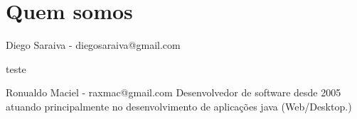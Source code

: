 \section{Quem somos}

\begin{frame}
	\begin{block}{Diego Saraiva - diegosaraiva@gmail.com}
		
		teste
	\end{block}
	
	\begin{block}{Ronualdo Maciel - raxmac@gmail.com}
			Desenvolvedor de software desde 2005 atuando principalmente no
			desenvolvimento de aplicações java (Web/Desktop.)
	\end{block}
\end{frame}